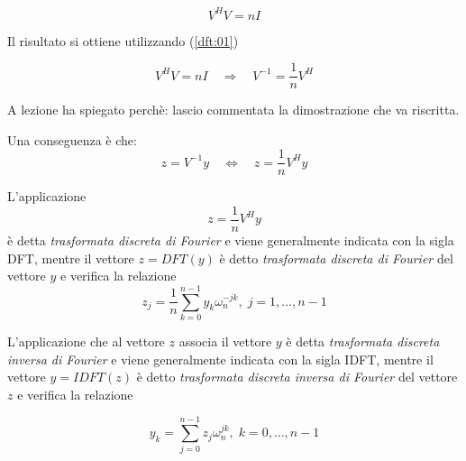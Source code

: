 \begin{property}
  $$V^{H}V = nI$$
\end{property}
Il risultato si ottiene utilizzando (\ref{dft:01})

\begin{theo}
  $$V^{H}V = nI  \quad \Rightarrow \quad V^{-1} = \dfrac{1}{n}V^{H}$$
\end{theo}
\begin{workinprogress}
  A lezione ha spiegato perch\`e: lascio commentata la dimostrazione
 che va riscritta.
\end{workinprogress}
\begin{comment}
  Inffatti
  $(V^HV)_{rs} = \displaystyle \sum_{k=0}^{n-} \overline{\omega_n}^{kr} \omega_n^{ks}
  = \ldots
  $
  Ma
  Vale inoltre vale la propriet\`a
  $$
  \overline{e^{-i\alpha}} = e^{-i\alpha}
  $$
  quindi
  $\overline{\omega_n}^{kr} = (\overline{e^{kr \dfrac{2\pi}{n}i}}) = \omega_{n}^{-kr}$
  Sostituendo
  $$\ldots \displaystyle \sum \omega_n ^{-kr + ks} =
  \sum_{k=0}^{n-1} \omega_n^{k(s-r)}
  $$
  Abbiamo due casi
  \begin{itemize}
  \item $n$ se $s=r$
  \item $0$ se $s \neq r$
  \end{itemize}
\end{comment}

Una conseguenza \`e che:
$$ z = V^{-1} y \quad \Longleftrightarrow \quad
z = \dfrac{1}{n}V^{H} y$$

\begin{defn}
  L'applicazione
  $$z = \dfrac{1}{n}V^{H} y$$
  \`e detta \emph{trasformata discreta di Fourier} e viene
  generalmente indicata con la sigla DFT, mentre il vettore
  $z= DFT(y)$ \`e detto \emph{trasformata discreta di Fourier}
  del vettore $y$ e verifica la relazione
  \begin{equation}
    \label{fft:02}
    z_j = \dfrac{1}{n} \displaystyle \sum_{k=0}^{n-1}
    y_k \omega_n^{-jk}, \; j=1, \ldots, n-1   
  \end{equation}
\end{defn}

\begin{defn}
  L'applicazione che al vettore $z$ associa il vettore $y$
  \`e detta \emph{trasformata discreta inversa di Fourier}
  e viene generalmente indicata con la sigla IDFT,
  mentre il vettore $y=IDFT(z)$ \`e detto
  \emph{trasformata discreta inversa di Fourier} del vettore
  $z$ e verifica la relazione

\begin{equation}
  \label{fft:03}
  y_k = \displaystyle \sum_{j=0}^{n-1} z_j \omega_n^{jk},
  \;  k =0, \ldots, n-1   
\end{equation}
\end{defn}

